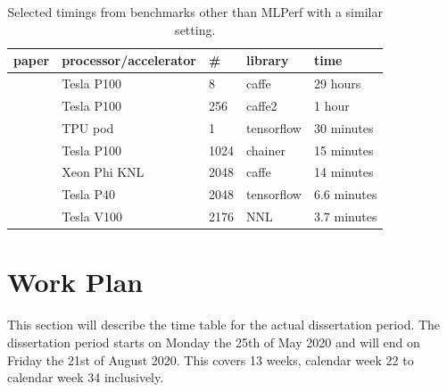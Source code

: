 \documentclass{article}
\begin{document}
\begin{table}
\begin{center}
\begin{tabu}{|l|l|l|l|l|}
\hline
paper &processor/accelerator &\# &library &time \\
\hline
\citet{he_et_al_2015} &Tesla P100 &8 &caffe &29 hours \\
\citet{goyal_et_al_2017} &Tesla P100 &256 &caffe2 &1 hour \\
\citet{smith_et_al_2017} &TPU pod &1 &tensorflow &30 minutes \\
\citet{akiba_et_al_2017} &Tesla P100 &1024 &chainer &15 minutes \\
\citet{you2017} &Xeon Phi KNL &2048 &caffe &14 minutes \\
\citet{jia_et_al_2018} &Tesla P40 &2048 &tensorflow &6.6 minutes \\
\citet{mikami_et_al_2018} &Tesla V100 &2176 &NNL &3.7 minutes \\
\hline
\end{tabu}
\end{center}
\caption{Selected timings from benchmarks other than MLPerf
  with a similar setting.}
\label{tab:benchmarks}
\end{table}


\section{Work Plan} %
\label{sec:work_plan}


This section will describe the time table for the actual
dissertation period.
The dissertation period starts on Monday the 25th of May
2020 and will end on Friday the 21st of August 2020.
This covers 13 weeks, calendar week 22 to calendar week 34
inclusively.
\end{document}
